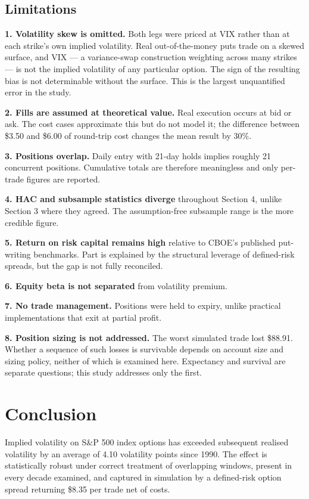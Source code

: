 \documentclass[11pt,a4paper]{article}
\begin{document}
\subsection{Limitations}

\textbf{1. Volatility skew is omitted.} Both legs were priced at VIX rather than at each strike's own
implied volatility. Real out-of-the-money puts trade on a skewed surface, and VIX --- a variance-swap
construction weighting across many strikes --- is not the implied volatility of any particular option.
The sign of the resulting bias is not determinable without the surface. This is the largest unquantified
error in the study.

\textbf{2. Fills are assumed at theoretical value.} Real execution occurs at bid or ask. The cost cases
approximate this but do not model it; the difference between \$3.50 and \$6.00 of round-trip cost changes
the mean result by 30\%.

\textbf{3. Positions overlap.} Daily entry with 21-day holds implies roughly 21 concurrent positions.
Cumulative totals are therefore meaningless and only per-trade figures are reported.

\textbf{4. HAC and subsample statistics diverge} throughout Section 4, unlike Section 3 where they agreed.
The assumption-free subsample range is the more credible figure.

\textbf{5. Return on risk capital remains high} relative to CBOE's published put-writing benchmarks. Part
is explained by the structural leverage of defined-risk spreads, but the gap is not fully reconciled.

\textbf{6. Equity beta is not separated} from volatility premium.

\textbf{7. No trade management.} Positions were held to expiry, unlike practical implementations that exit
at partial profit.

\textbf{8. Position sizing is not addressed.} The worst simulated trade lost \$88.91. Whether a
sequence of such losses is survivable depends on account size and sizing policy, neither of which is
examined here. Expectancy and survival are separate questions; this study addresses only the first.

\section{Conclusion}

Implied volatility on S\&P 500 index options has exceeded subsequent realised volatility by an average of
4.10 volatility points since 1990. The effect is statistically robust under correct treatment of
overlapping windows, present in every decade examined, and captured in simulation by a defined-risk
option spread returning \$8.35 per trade net of costs.
\end{document}
